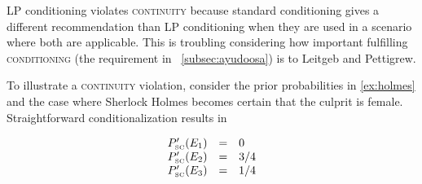 \documentclass[12pt]{article}
\begin{document}
LP conditioning violates \textsc{continuity} because standard
conditioning gives a different recommendation than LP conditioning
when they are used in a scenario where both are applicable. 
This is troubling considering how important fulfilling
\textsc{conditioning} (the requirement in
{\ubsection}~\ref{subsec:ayudoosa}) is to Leitgeb and Pettigrew.


To illustrate a \textsc{continuity} violation, consider the prior
probabilities in {\xample} \ref{ex:holmes} and the case where Sherlock
Holmes becomes certain that the culprit is female. Straightforward
conditionalization results in 

\begin{equation}
  \label{eq:sherlockcontsc}
  \begin{array}{rcl}
  P'_{\mbox{\tiny SC}}(E_{1})&=&0\\
  P'_{\mbox{\tiny SC}}(E_{2})&=&3/4\\
  P'_{\mbox{\tiny SC}}(E_{3})&=&1/4
\end{array}
\end{equation}


\end{document}
